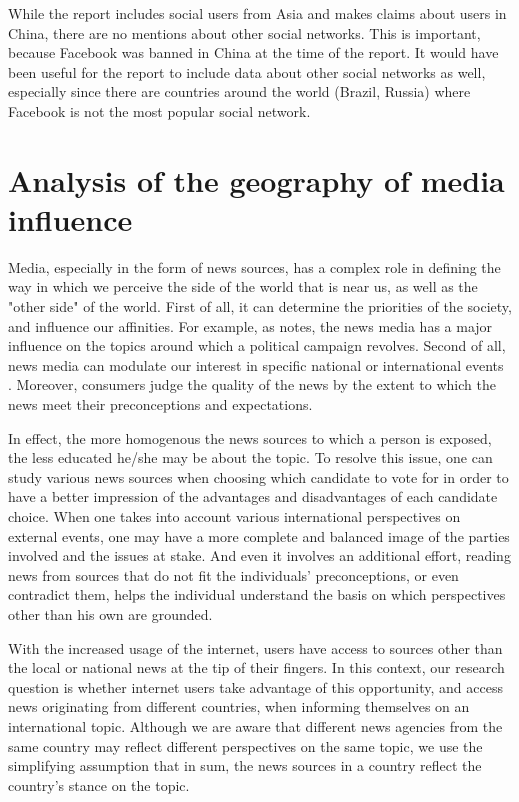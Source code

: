 \documentclass{acm_proc_10ptArticle-sp}
\begin{document}
While the report includes social users from Asia and makes claims about users in China, there are no mentions about other social networks. This is important, because Facebook was banned in China at the time of the report. It would have been useful for the report to include data about other social networks as well, especially since there are countries around the world (Brazil, Russia) where Facebook is not the most popular social network.


\section{Analysis of the geography of media influence}

Media, especially in the form of news sources, has a complex role in defining the way in which we perceive the side of the world that is near us, as well as the "other side" of the world. First of all, it can determine the priorities of the society, and influence our affinities. For example, as   notes, the news media has a major influence on the topics around which a political campaign revolves. Second of all, news media can modulate our interest in specific national or international events \cite{wanta2004agenda}. Moreover, consumers judge the quality of the news by the extent to which the news meet their preconceptions and expectations\cite{gentzkow2005media}. 

In effect, the more homogenous the news sources to which a person is exposed, the less educated he/she may be about the topic. To resolve this issue, one can study various news sources when choosing which candidate to vote for in order to have a better impression of the advantages and disadvantages of each candidate choice. When one takes into account various international perspectives on external events, one may have a more complete and balanced image of the parties involved and the issues at stake. And even it involves an additional effort, reading news from sources that do not fit the individuals' preconceptions, or even contradict them, helps the individual understand the basis on which perspectives other than his own are grounded.

With the increased usage of the internet, users have access to sources other than the local or national news at the tip of their fingers. In this context, our research question is whether internet users take advantage of this opportunity, and access news originating from different countries, when informing themselves on an international topic. Although we are aware that different news agencies from the same country may reflect different perspectives on the same topic, we use the simplifying assumption that in sum, the news sources in a country reflect the country's stance on the topic.
\end{document}
